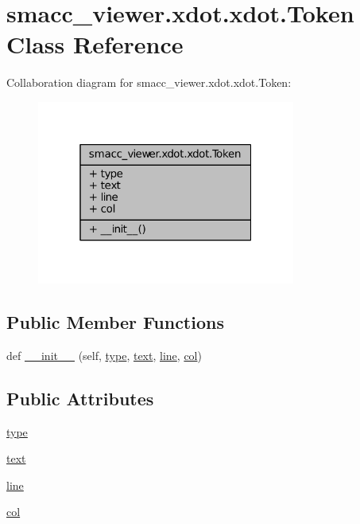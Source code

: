 \hypertarget{classsmacc__viewer_1_1xdot_1_1xdot_1_1Token}{}\section{smacc\+\_\+viewer.\+xdot.\+xdot.\+Token Class Reference}
\label{classsmacc__viewer_1_1xdot_1_1xdot_1_1Token}


Collaboration diagram for smacc\+\_\+viewer.\+xdot.\+xdot.\+Token\+:
\nopagebreak
\begin{figure}[H]
\begin{center}
\leavevmode
\includegraphics[width=241pt]{classsmacc__viewer_1_1xdot_1_1xdot_1_1Token__coll__graph}
\end{center}
\end{figure}
\subsection*{Public Member Functions}
\begin{DoxyCompactItemize}
\item 
def \hyperlink{classsmacc__viewer_1_1xdot_1_1xdot_1_1Token_a89d4b0790869797ecfc30fc5f4f4a598}{\+\_\+\+\_\+init\+\_\+\+\_\+} (self, \hyperlink{classsmacc__viewer_1_1xdot_1_1xdot_1_1Token_af1f0de5000e29708ef7f0ca9b39cb0d9}{type}, \hyperlink{classsmacc__viewer_1_1xdot_1_1xdot_1_1Token_af765dfd251590406846bad3ea9b6312f}{text}, \hyperlink{classsmacc__viewer_1_1xdot_1_1xdot_1_1Token_aa3b452b853aedc19738ba2d96a8aec36}{line}, \hyperlink{classsmacc__viewer_1_1xdot_1_1xdot_1_1Token_a4f3e968f9e24a9572198978f7fa32468}{col})
\end{DoxyCompactItemize}
\subsection*{Public Attributes}
\begin{DoxyCompactItemize}
\item 
\hyperlink{classsmacc__viewer_1_1xdot_1_1xdot_1_1Token_af1f0de5000e29708ef7f0ca9b39cb0d9}{type}
\item 
\hyperlink{classsmacc__viewer_1_1xdot_1_1xdot_1_1Token_af765dfd251590406846bad3ea9b6312f}{text}
\item 
\hyperlink{classsmacc__viewer_1_1xdot_1_1xdot_1_1Token_aa3b452b853aedc19738ba2d96a8aec36}{line}
\item 
\hyperlink{classsmacc__viewer_1_1xdot_1_1xdot_1_1Token_a4f3e968f9e24a9572198978f7fa32468}{col}
\end{DoxyCompactItemize}


